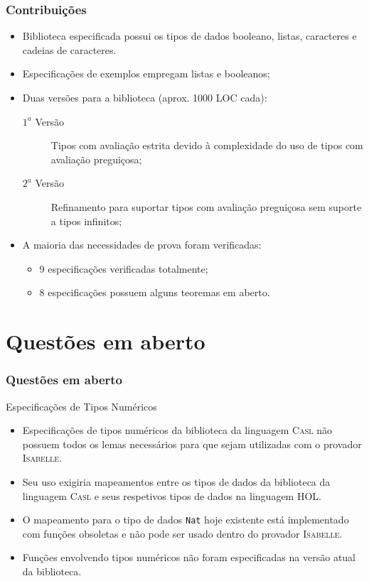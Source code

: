 \documentclass{beamer}
\newcommand{\CASL}{\textsc{Casl}\xspace}
\newcommand{\HOL}{\textsc{HOL}\xspace}
\newcommand{\Isabelle}{\textsc{Isabelle}\xspace}
\begin{document}
\begin{frame}
	\frametitle{Contribuições}
	
	\begin{itemize}
		\item Biblioteca especificada possui os tipos de dados booleano, listas, caracteres e cadeias de caracteres.
		\item Especiﬁcações de exemplos empregam listas e booleanos;
		\item Duas versões para a biblioteca (aprox. 1000 LOC cada):
		\begin{description}
			\item[$1^{a}$ Versão] Tipos com avaliação estrita devido à complexidade do uso de tipos com avaliação preguiçosa;
			\item[$2^{a}$ Versão] Reﬁnamento para suportar tipos com avaliação preguiçosa sem suporte a tipos infinitos;
		\end{description}
		\item A maioria das necessidades de prova foram verificadas:
			\begin{itemize}
		 		\item 9 especificações verificadas totalmente;
				\item 8 especificações possuem alguns teoremas em aberto.
			\end{itemize}
	\end{itemize}
\end{frame}

\section{Questões em aberto}

\begin{frame}
	\frametitle{Questões em aberto}
	
	\begin{block}{Especificações de Tipos Numéricos}
	\begin{itemize}	
		\item Especificações de tipos numéricos da biblioteca da linguagem \CASL não possuem todos os lemas necessários para que sejam utilizadas com o provador \Isabelle.
		\item Seu uso exigiria mapeamentos entre os tipos de dados da biblioteca da linguagem \CASL e seus respetivos tipos de dados na linguagem \HOL.
		\item O mapeamento para o tipo de dados \texttt{Nat} hoje existente está implementado com funções obsoletas e não pode ser usado dentro do provador \Isabelle.
		\item Funções envolvendo tipos numéricos não foram especificadas na versão atual da biblioteca.
	\end{itemize}
	\end{block}
\end{frame}
\end{document}
